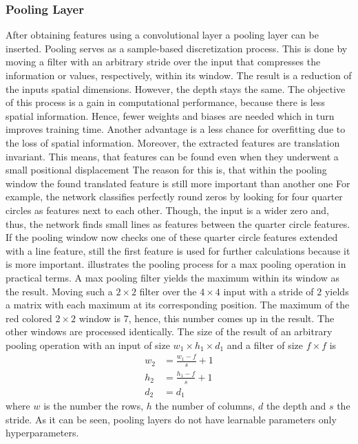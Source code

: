 \subsubsection{Pooling Layer}
\label{sec:cnn-pooling-layer}
After obtaining features using a convolutional layer a pooling layer can be inserted.
Pooling serves as a sample-based discretization process.
This is done by moving a filter with an arbitrary stride over the input that compresses the information or values, respectively, within its window.
The result is a reduction of the inputs spatial dimensions.
However, the depth stays the same.
The objective of this process is a gain in computational performance, because there is less spatial information.
Hence, fewer weights and biases are needed which in turn improves training time.
Another advantage is a less chance for overfitting due to the loss of spatial information.
Moreover, the extracted features are translation invariant.
This means, that features can be found even when they underwent a small positional displacement
The reason for this is, that within the pooling window the found translated feature is still more important than another one
For example, the network classifies perfectly round zeros by looking for four quarter circles as features next to each other.
Though, the input is a wider zero and, thus, the network finds small lines as features between the quarter circle features.
If the pooling window now checks one of these quarter circle features extended with a line feature, still the first feature is used for further calculations because it is more important.
 illustrates the pooling process for a max pooling operation in practical terms.
A max pooling filter yields the maximum within its window as the result.
Moving such a $2 \times 2$ filter over the $4 \times 4$ input with a stride of $2$ yields a matrix with each maximum at its corresponding position.
The maximum of the red colored $2 \times 2$ window is 7, hence, this number comes up in the result.
The other windows are processed identically.
The size of the result of an arbitrary pooling operation with an input of size $w_1 \times h_1 \times d_1$ and a filter of size $f \times f$ is
\begin{align}
	w_2 &= \frac{w_1 - f}{s}+1 \\
	h_2 &= \frac{h_1 - f}{s}+1 \\
	d_2 &= d_1
\end{align}
where $w$ is the number the rows, $h$ the number of columns, $d$ the depth and $s$ the stride.
As it can be seen, pooling layers do not have learnable parameters only hyperparameters.
